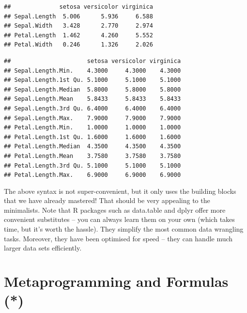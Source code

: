 \documentclass[10pt,b5paper,krantz1]{krantz}
\newenvironment{Shaded}{\begin{snugshade}}{\end{snugshade}}
\newcommand{\ControlFlowTok}[1]{\textcolor[rgb]{0.27,0.27,0.27}{\textbf{#1}}}
\newcommand{\DataTypeTok}[1]{\textcolor[rgb]{0.27,0.27,0.27}{#1}}
\newcommand{\DecValTok}[1]{\textcolor[rgb]{0.06,0.06,0.06}{#1}}
\newcommand{\KeywordTok}[1]{\textcolor[rgb]{0.27,0.27,0.27}{\textbf{#1}}}
\newcommand{\NormalTok}[1]{#1}
\newcommand{\OperatorTok}[1]{\textcolor[rgb]{0.43,0.43,0.43}{\textbf{#1}}}
\begin{document}
\begin{verbatim}
##              setosa versicolor virginica
## Sepal.Length  5.006      5.936     6.588
## Sepal.Width   3.428      2.770     2.974
## Petal.Length  1.462      4.260     5.552
## Petal.Width   0.246      1.326     2.026
\end{verbatim}

\begin{Shaded}
\end{Shaded}

\begin{verbatim}
##                      setosa versicolor virginica
## Sepal.Length.Min.    4.3000     4.3000    4.3000
## Sepal.Length.1st Qu. 5.1000     5.1000    5.1000
## Sepal.Length.Median  5.8000     5.8000    5.8000
## Sepal.Length.Mean    5.8433     5.8433    5.8433
## Sepal.Length.3rd Qu. 6.4000     6.4000    6.4000
## Sepal.Length.Max.    7.9000     7.9000    7.9000
## Petal.Length.Min.    1.0000     1.0000    1.0000
## Petal.Length.1st Qu. 1.6000     1.6000    1.6000
## Petal.Length.Median  4.3500     4.3500    4.3500
## Petal.Length.Mean    3.7580     3.7580    3.7580
## Petal.Length.3rd Qu. 5.1000     5.1000    5.1000
## Petal.Length.Max.    6.9000     6.9000    6.9000
\end{verbatim}

The above syntax is not super-convenient,
but it only uses the building blocks that we have already mastered!
That should be very appealing to the minimalists.
Note that R packages such as data.table and dplyr offer more convenient
substitutes -- you can always learn them on your own
(which takes time, but it's worth the hassle).
They simplify the most common data wrangling tasks. Moreover,
they have been optimised for speed -- they can handle much larger data sets
efficiently.

\hypertarget{metaprogramming-and-formulas}{%
\section{Metaprogramming and Formulas (*)}\label{metaprogramming-and-formulas}}
\end{document}

